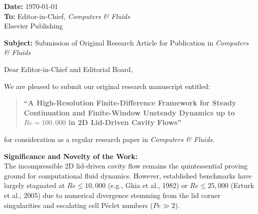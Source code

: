 \documentclass[11pt]{article}
\begin{document}
\noindent\textbf{Date:} \today \\
\textbf{To:} Editor-in-Chief, \textit{Computers \& Fluids} \\
Elsevier Publishing

\vspace{1.5em}

\noindent\textbf{Subject:} Submission of Original Research Article for Publication in \textit{Computers \& Fluids}

\vspace{1em}

\noindent Dear Editor-in-Chief and Editorial Board,

\vspace{0.8em}
We are pleased to submit our original research manuscript entitled:

\begin{quote}
\textbf{``A High-Resolution Finite-Difference Framework for Steady Continuation and Finite-Window Unsteady Dynamics up to $Re = 100{,}000$ in 2D Lid-Driven Cavity Flows''}
\end{quote}

\noindent for consideration as a regular research paper in \textit{Computers \& Fluids}.

\vspace{0.8em}
\noindent\textbf{Significance and Novelty of the Work:} \\
The incompressible 2D lid-driven cavity flow remains the quintessential proving ground for computational fluid dynamics. However, established benchmarks have largely stagnated at $Re \le 10,000$ (e.g., Ghia et al., 1982) or $Re \le 25,000$ (Erturk et al., 2005) due to numerical divergence stemming from the lid corner singularities and escalating cell P\'eclet numbers ($Pe \gg 2$). 
\end{document}
